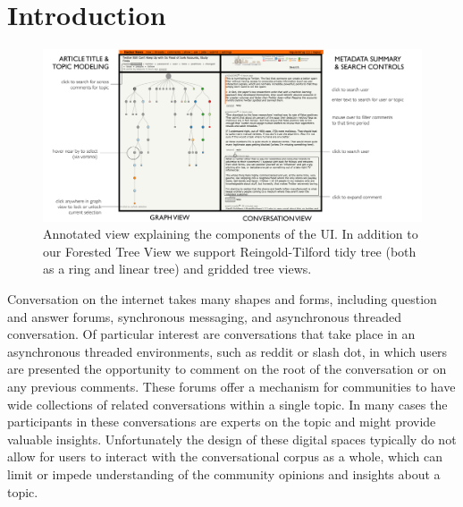 \documentclass{egpubl}
\begin{document}
\begin{abstract}


\printccsdesc   
\end{abstract}





\section{Introduction}


\begin{figure}[htb]
\centering
\includegraphics[width=\linewidth]{images/explainer.pdf}
%
%
\caption{
\label{fig:explainer}
Annotated view explaining the components of the UI. In addition to our Forested Tree View we support Reingold-Tilford tidy tree (both as a ring and linear tree) and gridded tree views.
}
\end{figure}


Conversation on the internet takes many shapes and forms, including question and answer forums, synchronous messaging, and asynchronous threaded conversation. 
%
Of particular interest are conversations that take place in an asynchronous threaded environments, such as reddit or slash dot, in which users are presented the opportunity to comment on the root of the conversation or on any previous comments. 
%
These forums offer a mechanism for communities to have wide collections of related conversations within a single topic.
%
In many cases the participants in these conversations are experts on the topic and might provide valuable insights.
%
Unfortunately the design of these digital spaces typically do not allow for users to interact with the conversational corpus as a whole, which can limit or impede understanding of the community opinions and insights about a topic.
\end{document}
